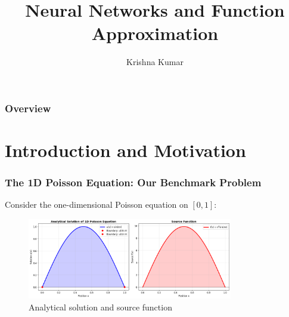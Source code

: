 \documentclass[notes]{beamer}
\title[Neural Networks \& Function Approximation]{Neural Networks and Function Approximation}
\author{Krishna Kumar} %
\institute[UT Austin] %
{
University of Texas at Austin \\
\medskip
\textit{
  \url{krishnak@utexas.edu}} %
}
\date{} %
\begin{document}
\begin{frame}
\titlepage %
\end{frame}

\begin{frame}
 \frametitle{Overview}
 \tableofcontents
\end{frame}


\section{Introduction and Motivation}

\begin{frame}
\frametitle{The 1D Poisson Equation: Our Benchmark Problem}

Consider the one-dimensional Poisson equation on $[0, 1]$:


\begin{figure}[ht]
	\centering
	\includegraphics[width=0.8\textwidth]{figs/poisson-analytical-solution.png}
	\caption*{Analytical solution and source function}
\end{figure}

\end{frame}
\end{document}

